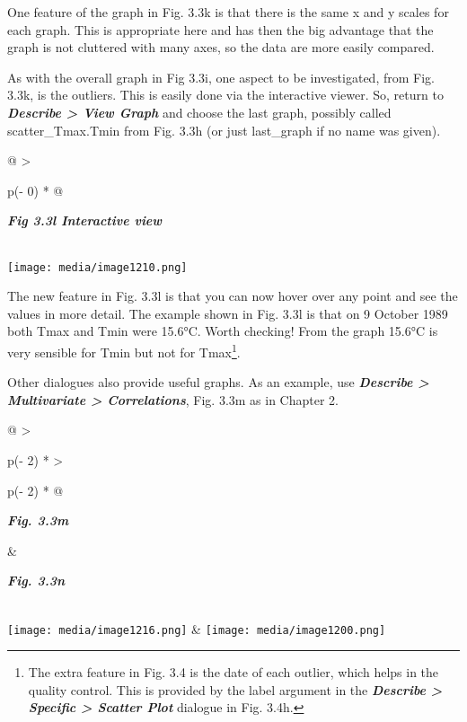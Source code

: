 \documentclass[
  letterpaper,
  DIV=11,
  numbers=noendperiod]{scrreprt}
\begin{document}
One feature of the graph in Fig. 3.3k is that there is the same x and y
scales for each graph. This is appropriate here and has then the big
advantage that the graph is not cluttered with many axes, so the data
are more easily compared.

As with the overall graph in Fig 3.3i, one aspect to be investigated,
from Fig. 3.3k, is the outliers. This is easily done via the interactive
viewer. So, return to \textbf{\emph{Describe \textgreater{} View Graph}}
and choose the last graph, possibly called scatter\_Tmax.Tmin from Fig.
3.3h (or just last\_graph if no name was given).

\begin{longtable}[]{@{}
  >{\raggedright\arraybackslash}p{(\columnwidth - 0\tabcolsep) * }@{}}
\toprule\noalign{}
\begin{minipage}[b]{\linewidth}\raggedright
\textbf{\emph{Fig 3.3l Interactive view}}
\end{minipage} \\
\midrule\noalign{}
\endhead
\bottomrule\noalign{}
\endlastfoot
\texttt{[image: media/image1210.png]} \\
\end{longtable}

The new feature in Fig. 3.3l is that you can now hover over any point
and see the values in more detail. The example shown in Fig. 3.3l is
that on 9 October 1989 both Tmax and Tmin were 15.6°C. Worth checking!
From the graph 15.6°C is very sensible for Tmin but not for
Tmax\footnote{The extra feature in Fig. 3.4 is the date of each outlier,
  which helps in the quality control. This is provided by the label
  argument in the \textbf{\emph{Describe \textgreater{} Specific
  \textgreater{} Scatter Plot}} dialogue in Fig. 3.4h.}.

Other dialogues also provide useful graphs. As an example, use
\textbf{\emph{Describe \textgreater{} Multivariate \textgreater{}
Correlations}}, Fig. 3.3m as in Chapter 2.

\begin{longtable}[]{@{}
  >{\raggedright\arraybackslash}p{(\columnwidth - 2\tabcolsep) * }
  >{\raggedright\arraybackslash}p{(\columnwidth - 2\tabcolsep) * }@{}}
\toprule\noalign{}
\begin{minipage}[b]{\linewidth}\raggedright
\textbf{\emph{Fig. 3.3m}}
\end{minipage} & \begin{minipage}[b]{\linewidth}\raggedright
\textbf{\emph{Fig. 3.3n}}
\end{minipage} \\
\midrule\noalign{}
\endhead
\bottomrule\noalign{}
\endlastfoot
\texttt{[image: media/image1216.png]}
&
\texttt{[image: media/image1200.png]} \\
\end{longtable}
\end{document}

